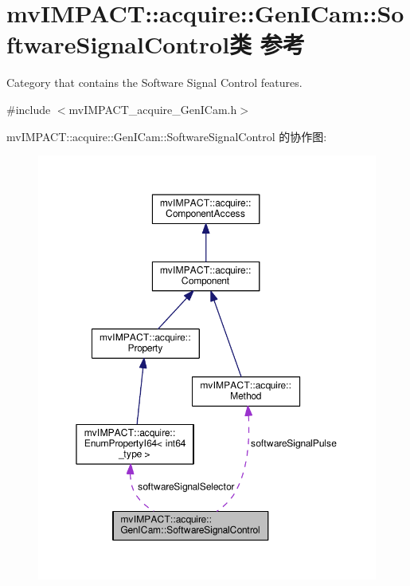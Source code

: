 \hypertarget{classmv_i_m_p_a_c_t_1_1acquire_1_1_gen_i_cam_1_1_software_signal_control}{\section{mv\+I\+M\+P\+A\+C\+T\+:\+:acquire\+:\+:Gen\+I\+Cam\+:\+:Software\+Signal\+Control类 参考}
\label{classmv_i_m_p_a_c_t_1_1acquire_1_1_gen_i_cam_1_1_software_signal_control}
}


Category that contains the Software Signal Control features.  




{\ttfamily \#include $<$mv\+I\+M\+P\+A\+C\+T\+\_\+acquire\+\_\+\+Gen\+I\+Cam.\+h$>$}



mv\+I\+M\+P\+A\+C\+T\+:\+:acquire\+:\+:Gen\+I\+Cam\+:\+:Software\+Signal\+Control 的协作图\+:
\nopagebreak
\begin{figure}[H]
\begin{center}
\leavevmode
\includegraphics[width=350pt]{classmv_i_m_p_a_c_t_1_1acquire_1_1_gen_i_cam_1_1_software_signal_control__coll__graph}
\end{center}
\end{figure}
